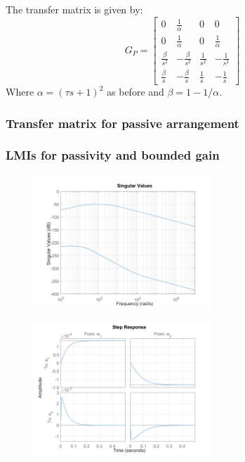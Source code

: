 \documentclass{article}
\begin{document}
The transfer matrix is given by:
\begin{equation}
    G_P = 
    \begin{bmatrix}
        0 & \frac{1}{\alpha} & 0 & 0 \\[6pt]
        0 & \frac{1}{\alpha} & 0 & \frac{1}{\alpha} \\[6pt]
        \frac{\beta}{s^2} & -\frac{\beta}{s^2} & \frac{1}{s^2} & -\frac{1}{s^2} \\[6pt]
        \frac{\beta}{s} & -\frac{\beta}{s} & \frac{1}{s} & -\frac{1}{s}
    \end{bmatrix}
\end{equation}
Where $\alpha = (\tau s + 1)^2$ as before and $\beta = 1 - 1/\alpha$.

\subsubsection{Transfer matrix for passive arrangement} 

\subsubsection{LMIs for passivity and bounded gain}

\begin{figure}[H]
    \centering
    \includegraphics[width=0.6\textwidth]{figures/K_p_sigma.png}
    \caption{}
\end{figure}

\begin{figure}[H]
    \centering
    \includegraphics[width=0.6\textwidth]{figures/K_p_step.png}
    \caption{}
\end{figure}
\end{document}
